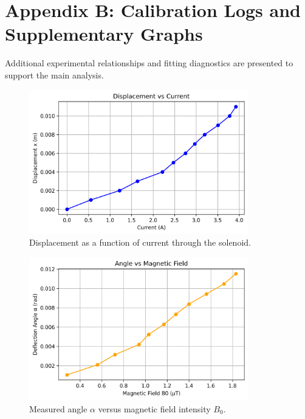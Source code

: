 \renewcommand{\thefigure}{B.\arabic{figure}}
\setcounter{figure}{0}

\section*{Appendix B: Calibration Logs and Supplementary Graphs}

Additional experimental relationships and fitting diagnostics are presented to support the main analysis.

\begin{figure}[H]
	\centering
	\includegraphics[width=0.85\textwidth]{Assests/Displacement_vs_Current.png}
	\caption{Displacement as a function of current through the solenoid.}
\end{figure}

\begin{figure}[H]
	\centering
	\includegraphics[width=0.85\textwidth]{Assests/Angle_vs_Field.png}
	\caption{Measured angle $\alpha$ versus magnetic field intensity $B_0$.}
\end{figure}

